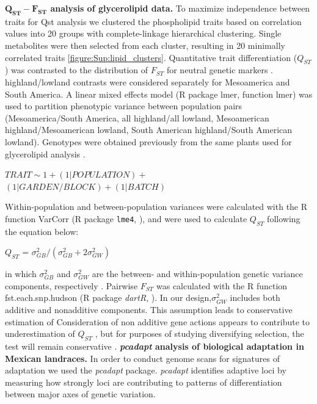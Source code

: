 \documentclass[9pt,twocolumn,twoside,lineno]{biorxiv}
\begin{document}
\textbf{$\mathbf{Q_{ST}-F_{ST}}$ analysis of glycerolipid data.}
To maximize independence between traits for Qst analysis we clustered the phospholipid traits based on correlation values into 20 groups with complete-linkage hierarchical clustering. Single metabolites were then selected from each cluster, resulting in 20 minimally correlated traits \cref{figure:Sup:lipid_clusters}. Quantitative trait differentiation ($Q_{ST}$) was contrasted to the distribution of $F_{ST}$ for neutral genetic markers \cite{whitlock2008evolutionary}. 
highland/lowland contrasts were considered separately for Mesoamerica and South America.
A linear mixed effects model (R package lmer, function lmer) was used to partition phenotypic variance between population pairs (Mesoamerica/South America, all highland/all lowland, Mesoamerican highland/Mesoamerican lowland, South American highland/South American lowland). 
Genotypes were obtained previously from the same plants used for glycerolipid analysis \cite{Janzen2021-lz}.
\begin{center}
${ TRAIT \sim 1 + (1|POPULATION) + }$\\
${(1|GARDEN/BLOCK) + (1|BATCH)}$
\end{center}
Within-population and between-population variances were calculated with the R function VarCorr (R package \texttt{lme4}, \citealp{bates2014lme4}), and were used to calculate $Q_{ST}$ following the equation below:
\begin{center}
$Q_{ST}$ = \(\sigma^{2}_{GB}/(\sigma^{2}_{GB}+2\sigma^{2}_{GW})\)
\end{center}
\noindent in which $\sigma^{2}_{GB}$ and $\sigma^{2}_{GW}$ are the between- and within-population genetic variance components, respectively \cite{Leinonen2013-ic}.
Pairwise $F_{ST}$ was calculated with the R function fst.each.snp.hudson (R package \textit{dartR}, \citealp{gruber2018dartr}).
In our design,$\sigma^{2}_{GW}$ includes both additive and nonadditive components. 
This assumption leads to conservative estimation of 
Consideration of non additive gene actions  appears  to  contribute  to  underestimation  of $Q_{ST}$ \cite{Whitlock1999-gu}, but for purposes of studying diversifying selection, the test will remain conservative \cite{Kronholm2010-by}.
\textbf{\textit{pcadapt} analysis of biological adaptation in Mexican landraces.}
In order to conduct genome scans for signatures of adaptation we used the \textit{pcadapt} \cite{Luu2017-ws} package.
\textit{pcadapt} identifies adaptive loci by measuring how strongly loci are contributing to patterns of differentiation between major axes of genetic variation.
\end{document}
